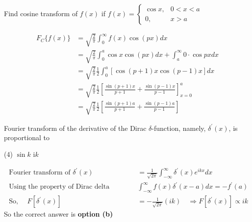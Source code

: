 \begin{exercise}
	Find cosine transform of $f(x)$ if $f(x)= \begin{cases}\cos x, & 0<x<a \\ 0, & x>a\end{cases}$
\end{exercise}
\begin{answer}
	\begin{align*}
	F_{C}\{f(x)\} &=\sqrt{\frac{2}{\pi}} \int_{0}^{\infty} f(x) \cos (p x) d x \\
	&=\sqrt{\frac{2}{\pi}} \int_{0}^{a} \cos x \cos (p x) d x+\int_{a}^{\infty} 0 \cdot \cos p x d x \\
	&=\sqrt{\frac{2}{\pi}} \frac{1}{2} \int_{0}^{a}[\cos (p+1) x \cos (p-1) x] d x\\
	&=\sqrt{\frac{2}{\pi}} \frac{1}{2}\left[\frac{\sin (p+1) x}{p+1}+\frac{\sin (p-1) x}{p-1}\right]_{x=0}^{a} \\
	&=\sqrt{\frac{2}{\pi}} \frac{1}{2}\left[\frac{\sin (p+1) a}{p+1}+\frac{\sin (p-1) a}{p-1}\right]
	\end{align*}
\end{answer}
\begin{exercise}
	Fourier transform of the derivative of the Dirac $\delta$-function, namely, $\delta^{\prime}(x)$, is proportional to
	 \begin{tasks}(4)
		\task[\textbf{c.}] $\sin k$
		\task[\textbf{d.}] $\mathrm{i} k$
	\end{tasks}
\end{exercise}
\begin{answer}
	\begin{align*}
	\text { Fourier transform of } \delta^{\prime}(x)&=\frac{1}{\sqrt{2 \pi}} \int_{-\infty}^{\infty} \delta^{\prime}(x) e^{i k x} d x\\
	\text { Using the property of Dirac delta function }& \int_{-\infty}^{\infty} f(x) \delta^{\prime}(x-a) d x=-f^{\prime}(a)\\
	\text { So, } \quad F\left[\delta^{\prime}(x)\right]&=-\frac{1}{\sqrt{2 \pi}}(i k) \quad \Rightarrow F\left[\delta^{\prime}(x)\right] \propto i k
	\end{align*}
	So the correct answer is \textbf{option (b)}
\end{answer}

